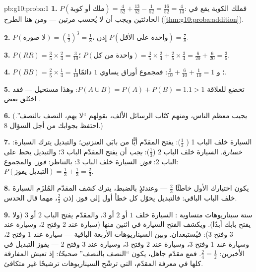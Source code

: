 \begin{solution}{pb:g10:proba:1}
\textbf{1.} $P(\text{ملك أو كوبة}) = \frac{4}{52} +
\frac{13}{52} - \frac{1}{52} = \frac{16}{52} = \frac{4}{13}$:
فملك الكوبة يقع في الحادثتين ويجب أن لا يُحسب
مرتين --- ومن هنا الطرح
(\cref{thm:g10:proba:addition}).

\textbf{2.} $P(\text{لا صورة}) = \left(\frac12\right)^3 =
\frac18$، إذن $P(\text{واحدة على الأقل}) = \frac78$.

\textbf{3.} $P(RR) = \frac35 \times \frac24 = \frac{3}{10}$؛
$P(\text{واحدة من كل}) = \frac35 \times \frac24 + \frac25
\times \frac34 = \frac{6}{20} + \frac{6}{20} = \frac35$.

\textbf{4.} $P(BB) = \frac25 \times \frac14 = \frac1{10}$؛ و
$\frac{3}{10} + \frac{6}{10} + \frac{1}{10} = 1$: فمجموع أوراق
 يساوي $1$ دائمًا.

\textbf{5.} تخضع  للعلاقة $P(A \cup B) = P(A) +
P(B) = 1.1 > 1$: وهذا مستحيل --- فقد اختُلق بعض .

\textbf{6.} (يجيب معظم الناس، ومنهم كتّاب الرسائل الألف،
بقولهم ``لا يهم، النصف بالنصف''. احتفظ بجوابك من أجل
السؤال 8.)

\textbf{7.} السيارة خلف الباب 1 ( $\frac13$): يفتح المقدّم
أيًّا من بابَي العنزتين؛ والتبديل يترك السيارة: \emph{خسارة}.
السيارة خلف الباب 2 ($\frac13$): \emph{يجب} أن يفتح المقدّم الباب 3؛
والتبديل يحط على الباب 2: \emph{فوز}. السيارة خلف الباب 3:
بالتناظر: \emph{فوز}. والمجموع:
$P(\text{التبديل يفوز}) = \frac13 + \frac13 = \frac23$.

\textbf{8.} يكون اختيارك الأول خاطئًا 
$\frac23$ --- وعندئذٍ بالضبط، يترك كشف المقدّم المُلزَم
السيارةَ خلف الباب الباقي: فالتبديل يحوّل
كل خطأ أول إلى فوز. إذن $\frac23$، مهما قال
الحدس.

\textbf{9.} ستة سيناريوهات متساوية : السيارة خلف $1$ أو $2$
أو $3$، والمقدّم يفتح الباب $2$ أو $3$ (ولا يفتح بابك أبدًا). ويكشف الفتح
السيارة في اثنين منها (سيارة عند 2 وفتح 2، وسيارة عند 3 وفتح 3):
فيُستبعدان. وبين السيناريوهات الأربعة الباقية --- سيارة عند 1 وفتح 2،
وسيارة عند 1 وفتح 3، وسيارة عند 2 وفتح 3، وسيارة عند 3 وفتح 2 --- يفوز التبديل
في الأخيرين: $\frac24 = \frac12$. فمع مقدّم جاهل، يكون
``النصف بالنصف'' \emph{صحيحًا}: إذ تعيش المفارقة كلها في
معرفة المقدّم، التي ترشّح السيناريوهات ترشيحًا غير متكافئ.


\end{solution}
